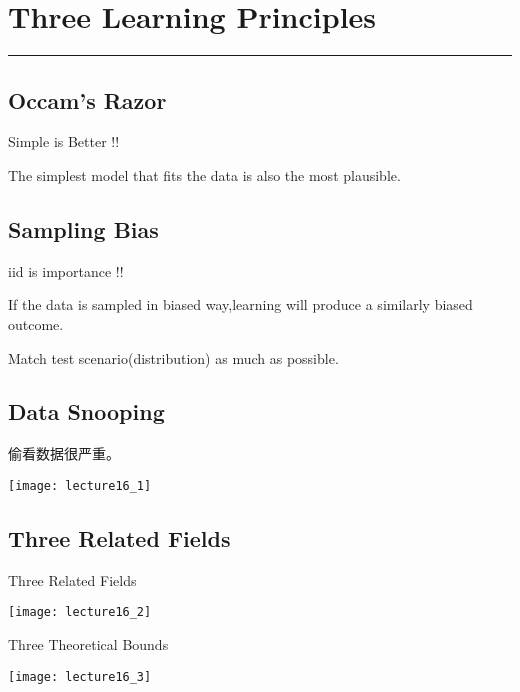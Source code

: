 \section{Three Learning Principles}
\noindent
{\color{LightRubineRed} \rule{\linewidth}{1mm} }
\subsection{Occam's Razor} %
\label{sub:occam_s_razor}
\begin{myremark}{}
\Large{Simple is Better !!}
\end{myremark}
The simplest model that fits the data is also the most plausible. \par

\subsection{Sampling Bias} %
\label{sub:sampling_bias}
\begin{myremark}{}
\Large{iid is importance !!}
\end{myremark}
If the data is sampled in biased way,learning will produce a similarly biased outcome. \par
\textcolor{mypink2}{\Large{Match test scenario(distribution)}} as much as possible.

\subsection{Data Snooping} %
\label{sub:data_snooping}
偷看数据很严重。 \par
\begin{center}
\texttt{[image: lecture16\_1]}
\end{center}

\subsection{Three Related Fields} %
\label{sub:three_related_fields}
\begin{center}
\Large{Three Related Fields} \par
\texttt{[image: lecture16\_2]}
\end{center}

\begin{center}
\Large{Three Theoretical Bounds} \par
\texttt{[image: lecture16\_3]}
\end{center}

